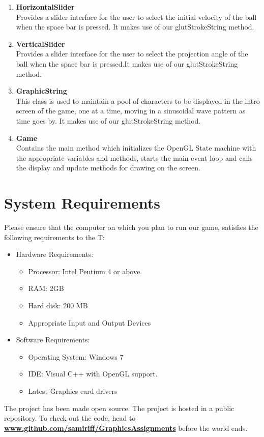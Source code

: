 \documentclass[12pt]{article} %
\begin{document}
\begin{enumerate}
\item{\textbf{HorizontalSlider}}\\
Provides a slider interface for the user to select the initial velocity of the ball when the space bar is pressed. It makes use of our glutStrokeString method.

\item{\textbf{VerticalSlider}}\\
Provides a slider interface for the user to select the projection angle of the ball when the space bar is pressed.It makes use of our glutStrokeString method.

\item{\textbf{GraphicString}}\\
This class is used to maintain a pool of characters to be displayed in the intro screen of the game, one at a time, moving in a sinusoidal wave pattern as time goes by. It makes use of our glutStrokeString method.

\item{\textbf{Game}}\\
Contains the main method which initializes the OpenGL State machine with the appropriate variables and methods, starts the main event loop and calls the display and update methods for drawing on the screen.

\end{enumerate}
\section{System Requirements}
Please ensure that the computer on which you plan to run our game, satisfies the following requirements to the T:

\begin{itemize}
\item{Hardware Requirements}:
\begin{itemize}
\item{Processor}: Intel Pentium 4 or above.
\item{RAM}: 2GB
\item{Hard disk}: 200 MB
\item{Appropriate Input and Output Devices}
\end{itemize}
\end{itemize}

\begin{itemize}
\item{Software Requirements}:
\begin{itemize}
\item{Operating System}: Windows 7
\item{IDE}: Visual C++ with OpenGL support.
\item{Latest Graphics card drivers}
\end{itemize}
\end{itemize}
The project has been made open source. The project is hosted in a public repository. To check out the code, head to \textbf{\url{www.github.com/samiriff/GraphicsAssignments}} before the world ends.
\end{document}

